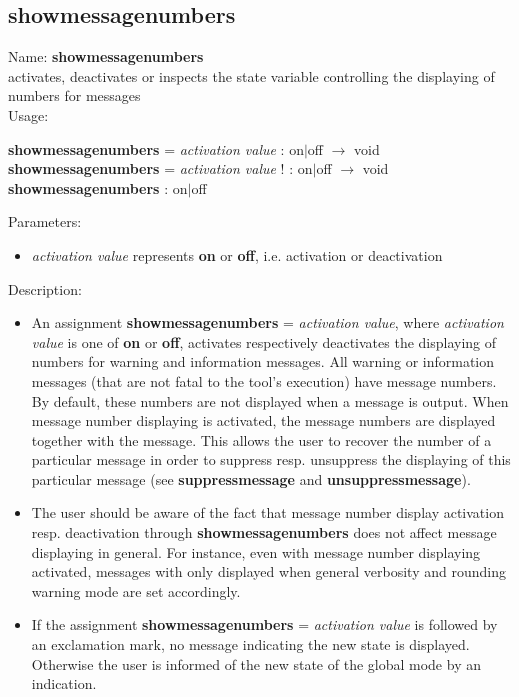 \subsection{showmessagenumbers}
\label{labshowmessagenumbers}
\noindent Name: \textbf{showmessagenumbers}\\
\phantom{aaa}activates, deactivates or inspects the state variable controlling the displaying of numbers for messages\\[0.2cm]
\noindent Usage: 
\begin{center}
\textbf{showmessagenumbers} = \emph{activation value} : \textsf{on$|$off} $\rightarrow$ \textsf{void}\\
\textbf{showmessagenumbers} = \emph{activation value} ! : \textsf{on$|$off} $\rightarrow$ \textsf{void}\\
\textbf{showmessagenumbers} : \textsf{on$|$off}\\
\end{center}
Parameters: 
\begin{itemize}
\item \emph{activation value} represents \textbf{on} or \textbf{off}, i.e. activation or deactivation
\end{itemize}
\noindent Description: \begin{itemize}

\item An assignment \textbf{showmessagenumbers} = \emph{activation value}, where \emph{activation value}
   is one of \textbf{on} or \textbf{off}, activates respectively deactivates the
   displaying of numbers for warning and information messages. All
   \sollya warning or information messages (that are not fatal to the
   tool's execution) have message numbers. By default, these numbers are
   not displayed when a message is output. When message number displaying
   is activated, the message numbers are displayed together with the
   message. This allows the user to recover the number of a particular
   message in order to suppress resp. unsuppress the displaying of this
   particular message (see \textbf{suppressmessage} and \textbf{unsuppressmessage}).

\item The user should be aware of the fact that message number display
   activation resp. deactivation through \textbf{showmessagenumbers} does not affect message
   displaying in general. For instance, even with message number
   displaying activated, messages with only displayed when general
   verbosity and rounding warning mode are set accordingly.

\item If the assignment \textbf{showmessagenumbers} = \emph{activation value} is followed by an
   exclamation mark, no message indicating the new state is
   displayed. Otherwise the user is informed of the new state of the
   global mode by an indication.
\end{itemize}
